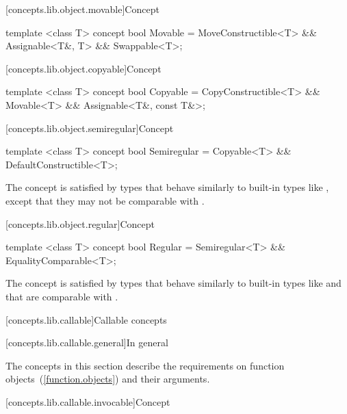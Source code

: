 [concepts.lib.object.movable]{Concept }

%
\begin{itemdecl}
template <class T>
concept bool Movable =
  MoveConstructible<T> &&
  Assignable<T&, T> &&
  Swappable<T>;
\end{itemdecl}

[concepts.lib.object.copyable]{Concept }

%
\begin{itemdecl}
template <class T>
concept bool Copyable =
  CopyConstructible<T> &&
  Movable<T> &&
  Assignable<T&, const T&>;
\end{itemdecl}

[concepts.lib.object.semiregular]{Concept }

%
\begin{itemdecl}
template <class T>
concept bool Semiregular =
  Copyable<T> &&
  DefaultConstructible<T>;
\end{itemdecl}

\begin{itemdescr}
\pnum
\enternote The  concept is satisfied by types that
behave similarly to built-in types like , except that they may not be
comparable with \tcode{==}.\exitnote
\end{itemdescr}

[concepts.lib.object.regular]{Concept }

%
\begin{itemdecl}
template <class T>
concept bool Regular =
  Semiregular<T> &&
  EqualityComparable<T>;
\end{itemdecl}

\begin{itemdescr}
\pnum
\enternote The  concept is satisfied by types that behave
similarly to built-in types like  and that are comparable with \tcode{==}.\exitnote
\end{itemdescr}

[concepts.lib.callable]{Callable concepts}

[concepts.lib.callable.general]{In general}

\pnum
The concepts in this section describe the requirements on function
objects~(\ref{function.objects}) and their arguments.

[concepts.lib.callable.invocable]{Concept }

